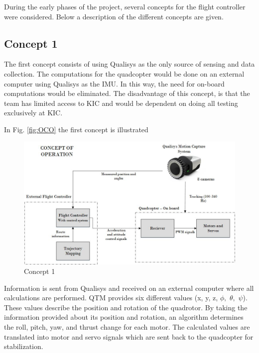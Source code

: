 During the early phases of the project, several concepts for the flight controller were considered. Below a description of the different concepts are given.

\clearpage

\subsection{Concept 1}

The first concept consists of using Qualisys as the only source of sensing and data collection. The computations for the quadcopter would be done on an external computer using Qualisys as the IMU. In this way, the need for on-board computations would be eliminated. The disadvantage of this concept, is that the team has limited access to KIC and would be dependent on doing all testing exclusively at KIC. 

In Fig. \ref{fig:OCO} the first concept is illustrated\\
\begin{figure}[H]
          \centering
            \includegraphics[scale = 0.6]{VAPIQ-PICTURES/ConceptOfOperation.jpg}
                \caption{Concept 1}
                \label{fig:OCO}
            \label{dir}
\end{figure}

Information is sent from Qualisys and received on an external computer where all calculations are performed. QTM provides six different values (x, y, z, $ \phi, $ $ \theta ,$ $ \psi $). These values describe the position and rotation of the quadrotor. By taking the information provided about its position and rotation, an algorithm determines the roll, pitch, yaw, and thrust change for each motor. The calculated values are translated into motor and servo signals which are sent back to the quadcopter for stabilization. \bigskip

